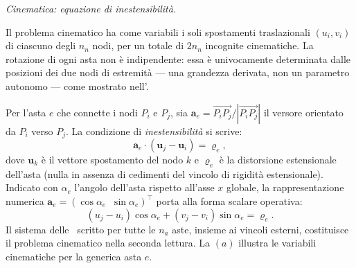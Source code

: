 \noindent\textit{Cinematica: equazione di inestensibilità.}
\label{subsec:inestensibilita}

Il problema cinematico ha come variabili i soli
spostamenti traslazionali $(u_i, v_i)$ di ciascuno
degli $n_n$ nodi, per un totale di $2n_n$ incognite
cinematiche. La rotazione di ogni asta non è
indipendente: essa è univocamente determinata dalle
posizioni dei due nodi di estremità --- una grandezza
derivata, non un parametro autonomo --- come mostrato
nell'.

Per l'asta $e$ che connette i nodi $P_i$ e $P_j$,
sia $\mathbf{a}_e = \overrightarrow{P_iP_j}/|\overrightarrow{P_iP_j}|$
il versore orientato da $P_i$ verso $P_j$.
La condizione di \emph{inestensibilità} si scrive:
\begin{equation}\label{eq:inestensibilita}
	\mathbf{a}_e \cdot (\mathbf{u}_j - \mathbf{u}_i) = \varrho_e,
\end{equation}
dove $\mathbf{u}_k$ è il vettore spostamento del nodo $k$
e $\varrho_e$ è la distorsione estensionale dell'asta
(nulla in assenza di cedimenti del vincolo di rigidità
estensionale). Indicato con $\alpha_e$ l'angolo dell'asta
rispetto all'asse $x$ globale, la rappresentazione numerica
$\bm{a}_e = (\cos\alpha_e\;\;\sin\alpha_e)^\top$
porta alla forma scalare operativa:
\begin{equation}\label{eq:inest_scalare}
	(u_j - u_i)\cos\alpha_e + (v_j - v_i)\sin\alpha_e = \varrho_e.
\end{equation}
Il sistema delle~ scritto
per tutte le $n_a$ aste, insieme ai vincoli esterni,
costituisce il problema cinematico nella seconda lettura.
La $(a)$ illustra
le variabili cinematiche per la generica asta $e$.

